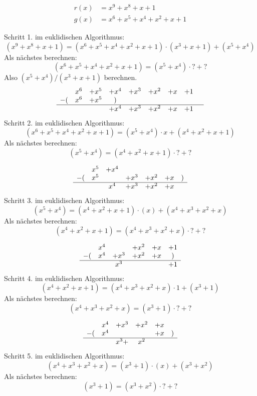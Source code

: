 \documentclass{article} %
\begin{document}
\begin{mybox}
\begin{align*}
    r(x) & = x^9 + x^8 + x + 1 \\
    g(x) &= x^6 + x^5 + x^4 + x^2 + x + 1 
\end{align*}
\end{mybox}
\begin{mybox}
 Schritt 1. im euklidischen Algorithmus: 
\[ 
(x^9 + x^8 + x + 1) = (x^6 + x^5 + x^4 + x^2 + x + 1 ) \cdot (x^3 + x +1) + (x^5 + x^4)
\]
Als nächstes berechnen: 
\[
(x^6 + x^5 + x^4 + x^2 + x + 1 ) = (x^5 + x^4) \cdot ? + ? 
\]
Also $(x^5 + x^4) / (x^3 + x +1)$ berechnen. 
\[
\begin{array}{ccccccccc}
    & x^6   & +x^5  &+x^4   &+x^3   &+x^2   &+x &+1 &  \\
-(  &x^6    & +x^5 & )  \\\hline
    &       &       &+x^4   &+x^3   &+x^2   &+x &+1 &  \\
\end{array}
\]
 Schritt 2. im euklidischen Algorithmus: 
\[
(x^6 + x^5 + x^4 + x^2 + x + 1 ) = (x^5 + x^4) \cdot x + (x^4 + x^2 + x + 1)
\]
Als nächstes berechnen:
\[
 (x^5 + x^4) = (x^4 + x^2 + x + 1) \cdot ? + ? 
\]

\[
\begin{array}{ccccccccc}
    &x^5&+x^4 \\
 -( &x^5   &   &+x^3   &+x^2 &+x & ) \\ \hline
    & & x^4 & +x^3 & +x^2 & +x
\end{array}
\]
Schritt 3. im euklidischen Algorithmus: 
\[
 (x^5 + x^4) = (x^4 + x^2 + x + 1) \cdot (x) + (x^4+x^3+x^2+x)
\]
Als nächstes berechnen:
\[
(x^4 + x^2 + x + 1) = (x^4+x^3+x^2+x) \cdot ? +? 
\]

\[
\begin{array}{ccccccccc}
  & x^4 & & + x^2 & + x & + 1  \\
 -( & x^4 & +x^3 & +x^2 & +x & ) \\ \hline
 & & x^3  & & & +1
\end{array}
\]
Schritt 4. im euklidischen Algorithmus:
\[
(x^4 + x^2 + x + 1) = (x^4+x^3+x^2+x) \cdot 1 + (x^3 +1) 
\]
Als nächstes berechnen:
\[
(x^4+x^3+x^2+x) = (x^3 +1) \cdot ? + ? 
\]

\[
\begin{array}{ccccccccc}
  & x^4 & + x^3 & + x^2 & + x \\ 
-(& x^4 & & & +x & ) \\ \hline
& & x^3 + & x^2 
\end{array}
\]
Schritt 5. im euklidischen Algorithmus:
\[
(x^4+x^3+x^2+x) = (x^3 +1) \cdot (x) +  (x^3 +  x^2) 
\]
Als nächstes berechnen:
\[
(x^3 +1) = (x^3 +  x^2)  \cdot ? + ? 
\]
\end{mybox}
\end{document}
